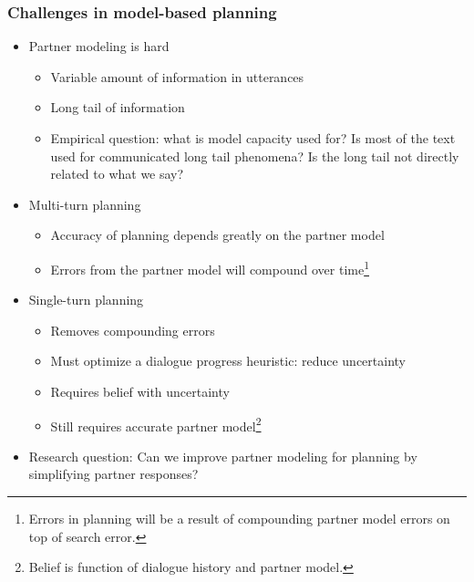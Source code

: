 \documentclass{beamer}
\begin{document}
\begin{frame}
\frametitle{Challenges in model-based planning}
\begin{itemize}
\item Partner modeling is hard
    \begin{itemize}
    \item Variable amount of information in utterances
    \item Long tail of information
    \item Empirical question: what is model capacity used for?
        Is most of the text used for communicated long tail phenomena?
        Is the long tail not directly related to what we say?
    \end{itemize}
\item Multi-turn planning
    \begin{itemize}
    \item Accuracy of planning depends greatly on the partner model
    \item Errors from the partner model will compound over time\footnote{
        Errors in planning will be a result of compounding partner model errors
            on top of search error.
    }
    \end{itemize}
\item Single-turn planning
    \begin{itemize}
    \item Removes compounding errors
    \item Must optimize a dialogue progress heuristic: reduce uncertainty
    \item Requires belief with uncertainty
    \item Still requires accurate partner model\footnote{
        Belief is function of dialogue history and partner model.
    }
    \end{itemize}
\item Research question: Can we improve partner modeling for planning
    by simplifying partner responses?
\end{itemize}
\end{frame}
\end{document}
